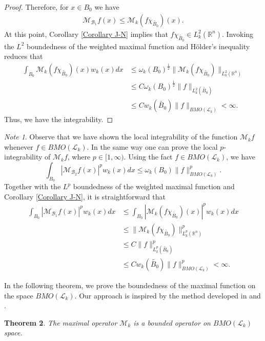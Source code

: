\documentclass[11pt, reqno]{amsproc}
\newtheorem{theorem}{Theorem}[section]
\theoremstyle{definition}
\theoremstyle{remark}
\newtheorem{note}[theorem]{Note}
\numberwithin{equation}{section}
\begin{document}
\begin{proof}
Therefore, for $x\in B_0$ we have 
\begin{align*}
    \mathcal{M}_{\mathcal{B}_1}f(x) \leq \mathcal{M}_k(f\chi_{\widetilde{B_0}})(x).
\end{align*} At this point, Corollary \ref{Corollary J-N} implies that $f\chi_{\widetilde{B_0}} \in L_k^2(\mathbb{R}^n)$. Invoking the $L^2$ boundedness of the weighted maximal function \cite{Alto-2011} and H\"older's inequality reduces that 
\begin{align*}
    \int_{B_0}\mathcal{M}_k(f\chi_{\widetilde{B_0}})(x)w_k(x)dx &\leq \omega_k(B_0)^{\frac{1}{2}}\|\mathcal{M}_k(f\chi_{\widetilde{B_0}})\|_{L_k^2(\mathbb{R}^n)}\\
    & \leq C  \omega_k(B_0)^{\frac{1}{2}} \|f\|_{L_k^2({\widetilde{B_0}})}\\
    & \leq C w_k(\widetilde{B_0})\|f\|_{BMO(\mathcal{L}_k)} < \infty.
\end{align*} Thus, we have the integrability.
\end{proof}
\begin{note}
Observe that we have shown the local integrability of the function $\mathcal{M}_kf$ whenever $f\in BMO(\mathcal{L}_k)$. In the same way one  can  prove the local $p$-integrability of $\mathcal{M}_kf$, where $p\in [1, \infty)$. Using the fact $f\in BMO(\mathcal{L}_k)$, we have  $$\int_{B_0}|\mathcal{M}_{\mathcal{B}_2}f(x)|^p w_k(x)dx \leq \omega_k(B_0)\|f\|^p_{BMO(\mathcal{L}_k)}.$$ 
Together with the $L^p$ boundedness of the weighted maximal function \cite{Alto-2011} and Corollary \ref{Corollary J-N}, it is straightforward that
\begin{align*}
\int_{B_0}|\mathcal{M}_{\mathcal{B}_1}f(x)|^pw_k(x)dx & \leq \int_{B_0}|\mathcal{M}_k(f\chi_{\widetilde{B_0}})(x)|^pw_k(x)dx\\
    &\leq \|\mathcal{M}_k(f\chi_{\widetilde{B_0}})\|^p_{L_k^p(\mathbb{R}^n)}\\
    & \leq C\|f\|^p_{L_k^p({\widetilde{B_0}})}\\
    & \leq C w_k(\widetilde{B_0})\|f\|^p_{BMO(\mathcal{L}_k)} < \infty.
\end{align*}
\end{note}
In the following theorem, we prove the boundedness of the maximal function on the space $BMO(\mathcal{L}_k)$. Our approach is inspired by the method developed in  \cite{Bennett} and \cite{Lin}. 
\begin{theorem}
    The maximal operator $\mathcal{M}_k$ is a bounded operator on $BMO(\mathcal{L}_k)$ space.
\end{theorem}
\end{document}
